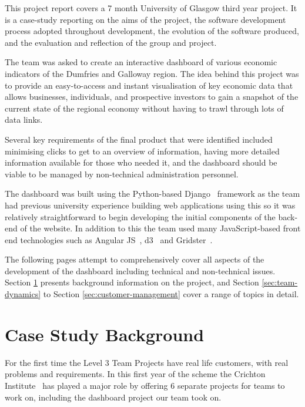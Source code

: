 \documentclass{l3proj}
\begin{document}
This project report covers a 7 month University of Glasgow third year project. It is a case-study reporting on the aims of the project, the software development process adopted throughout development, the evolution of the software produced, and the evaluation and reflection of the group and project.

The team was asked to create an interactive dashboard of various economic indicators of the Dumfries and Galloway region. The idea behind this project was to provide an easy-to-access and instant visualisation of key economic data that allows businesses, individuals, and prospective investors to gain a snapshot of the current state of the regional economy without having to trawl through lots of data links.

Several key requirements of the final product that were identified included minimising clicks to get to an overview of information, having more detailed information available for those who needed it, and the dashboard should be viable to be managed by non-technical administration personnel.

The dashboard was built using the Python-based Django~\cite{Django} framework as the team had previous university experience building web applications using this so it was relatively straightforward to begin developing the initial components of the back-end of the website. In addition to this the team used many JavaScript-based front end technologies such as Angular JS~\cite{AngularWebpage}, d3~\cite{d3Webpage} and Gridster~\cite{AngularGridster}.

The following pages attempt to comprehensively cover all aspects of the development of the dashboard including technical and non-technical issues. Section \ref{sec:background} presents background information on the project, and Section \ref{sec:team-dynamics} to Section \ref{sec:customer-management} cover a range of topics in detail.

\section{Case Study Background}
\label{sec:background}

For the first time the Level 3 Team Projects have real life customers, with real problems and requirements. In this first year of the scheme the Crichton Institute~\cite{CrichtonInstitute} has played a major role by offering 6 separate projects for teams to work on, including the dashboard project our team took on.
\end{document}

